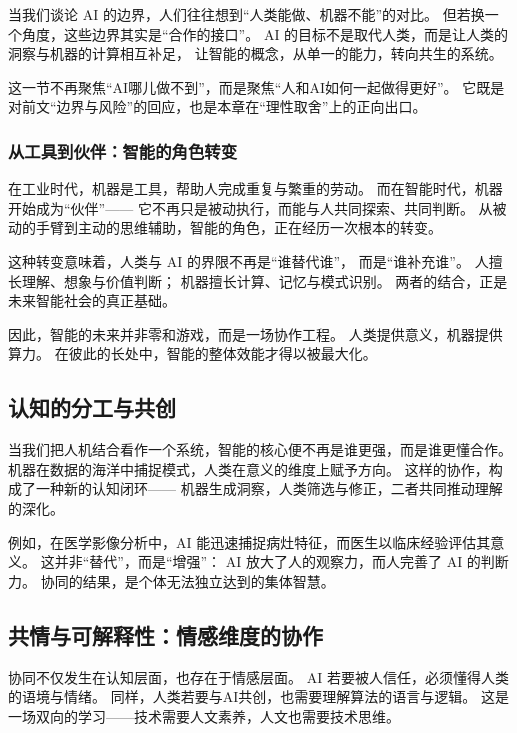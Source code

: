 当我们谈论 AI 的边界，人们往往想到“人类能做、机器不能”的对比。  
但若换一个角度，这些边界其实是“合作的接口”。  
AI 的目标不是取代人类，而是让人类的洞察与机器的计算相互补足，  
让智能的概念，从单一的能力，转向共生的系统。

这一节不再聚焦“AI哪儿做不到”，而是聚焦“人和AI如何一起做得更好”。
它既是对前文“边界与风险”的回应，也是本章在“理性取舍”上的正向出口。


\subsubsection{从工具到伙伴：智能的角色转变}

在工业时代，机器是工具，帮助人完成重复与繁重的劳动。  
而在智能时代，机器开始成为“伙伴”——  
它不再只是被动执行，而能与人共同探索、共同判断。  
从被动的手臂到主动的思维辅助，智能的角色，正在经历一次根本的转变。

这种转变意味着，人类与 AI 的界限不再是“谁替代谁”，  
而是“谁补充谁”。  
人擅长理解、想象与价值判断；  
机器擅长计算、记忆与模式识别。  
两者的结合，正是未来智能社会的真正基础。  

因此，智能的未来并非零和游戏，而是一场协作工程。  
人类提供意义，机器提供算力。  
在彼此的长处中，智能的整体效能才得以被最大化。

\subsection{认知的分工与共创}

当我们把人机结合看作一个系统，智能的核心便不再是谁更强，而是谁更懂合作。  
机器在数据的海洋中捕捉模式，人类在意义的维度上赋予方向。  
这样的协作，构成了一种新的认知闭环——  
机器生成洞察，人类筛选与修正，二者共同推动理解的深化。

例如，在医学影像分析中，AI 能迅速捕捉病灶特征，而医生以临床经验评估其意义。  
这并非“替代”，而是“增强”：  
AI 放大了人的观察力，而人完善了 AI 的判断力。  
协同的结果，是个体无法独立达到的集体智慧。

\subsection{共情与可解释性：情感维度的协作}

协同不仅发生在认知层面，也存在于情感层面。  
AI 若要被人信任，必须懂得人类的语境与情绪。  
同样，人类若要与AI共创，也需要理解算法的语言与逻辑。  
这是一场双向的学习——技术需要人文素养，人文也需要技术思维。

